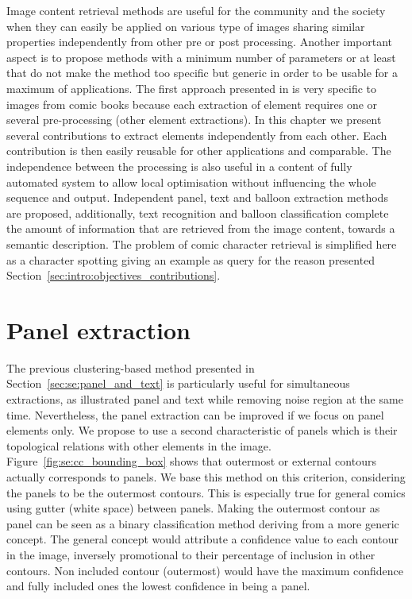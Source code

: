 Image content retrieval methods are useful for the community and the society when they can easily be applied on various type of images sharing similar properties independently from other pre or post processing.
Another important aspect is to propose methods with a minimum number of parameters or at least that do not make the method too specific but generic in order to be usable for a maximum of applications.
The first approach presented in  is very specific to images from comic books because each extraction of element requires one or several pre-processing (other element extractions).
In this chapter we present several contributions to extract elements independently from each other.
Each contribution is then easily reusable for other applications and comparable.
The independence between the processing is also useful in a content of fully automated system to allow local optimisation without influencing the whole sequence and output.
Independent panel, text and balloon extraction methods are proposed, additionally, text recognition and balloon classification complete the amount of information that are retrieved from the image content, towards a semantic description.
The problem of comic character retrieval is simplified here as a character spotting giving an example as query for the reason presented Section~\ref{sec:intro:objectives_contributions}.

\section{Panel extraction}
\label{sec:in:panel_extraction}

The previous clustering-based method presented in Section~\ref{sec:se:panel_and_text} is particularly useful for simultaneous extractions, as illustrated panel and text while removing noise region at the same time.
Nevertheless, the panel extraction can be improved if we focus on panel elements only.
We propose to use a second characteristic of panels which is their topological relations with other elements in the image.
Figure~\ref{fig:se:cc_bounding_box} shows that outermost or external contours actually corresponds to panels.
We base this method on this criterion, considering the panels to be the outermost contours.
This is especially true for general comics using gutter (white space) between panels.
Making the outermost contour as panel can be seen as a binary classification method deriving from a more generic concept.
The general concept would attribute a confidence value to each contour in the image, inversely promotional to their percentage of inclusion in other contours.
Non included contour (outermost) would have the maximum confidence and fully included ones the lowest confidence in being a panel.

